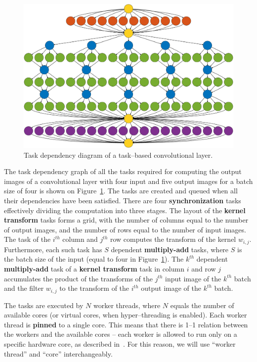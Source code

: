 \documentclass[conference]{./IEEEtran/IEEEtran}
\begin{document}
  \begin{figure}
    \begin{center}
      \includegraphics[width=0.95\columnwidth]{fig/deps}
    \end{center}
    \caption{Task dependency diagram of a task--based convolutional
      layer.}
    \label{fig:task_deps}
  \end{figure}


  The task dependency graph of all the tasks required for computing
  the output images of a convolutional layer with four input and five
  output images for a batch size of four is shown on
  Figure~\ref{fig:task_deps}.  The tasks are created and queued when
  all their dependencies have been satisfied.  There are four {\bf
    synchronization} tasks effectively dividing the computation into
  three stages.  The layout of the {\bf kernel transform} tasks forms
  a grid, with the number of columns equal to the number of output
  images, and the number of rows equal to the number of input images.
  The task of the $i^{th}$ column and $j^{th}$ row computes the
  transform of the kernel $w_{i,j}$.  Furthermore, each such task has
  $S$ dependent {\bf multiply-add} tasks, where $S$ is the batch size
  of the input (equal to four in Figure~\ref{fig:task_deps}).  The
  $k^{th}$ dependent {\bf multiply-add} task of a {\bf kernel
    transform} task in column $i$ and row $j$ accumulates the product
  of the transforms of the $j^{th}$ input image of the $k^{th}$ batch
  and the filter $w_{i,j}$ to the transform of the $i^{th}$ output
  image of the $k^{th}$ batch.

  The tasks are executed by $N$ worker threads, where $N$ equals the
  number of available cores (or virtual cores, when hyper--threading
  is enabled).  Each worker thread is {\bf pinned} to a single core.
  This means that there is 1--1 relation between the workers and the
  available cores -- each worker is allowed to run only on a specific
  hardware core, as described in~\cite{jeffers2015high}.  For this
  reason, we will use ``worker thread'' and ``core'' interchangeably.
\end{document}
